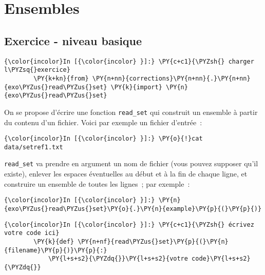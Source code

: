     \hypertarget{ensembles}{%
\section{Ensembles}\label{ensembles}}

    \hypertarget{exercice---niveau-basique}{%
\subsection{Exercice - niveau basique}\label{exercice---niveau-basique}}

    \begin{Verbatim}[commandchars=\\\{\}]
{\color{incolor}In [{\color{incolor} }]:} \PY{c+c1}{\PYZsh{} charger l\PYZsq{}exercice}
        \PY{k+kn}{from} \PY{n+nn}{corrections}\PY{n+nn}{.}\PY{n+nn}{exo\PYZus{}read\PYZus{}set} \PY{k}{import} \PY{n}{exo\PYZus{}read\PYZus{}set}
\end{Verbatim}


    On se propose d'écrire une fonction \texttt{read\_set} qui construit un
ensemble à partir du contenu d'un fichier. Voici par exemple un fichier
d'entrée~:

    \begin{Verbatim}[commandchars=\\\{\}]
{\color{incolor}In [{\color{incolor} }]:} \PY{o}{!}cat data/setref1.txt
\end{Verbatim}


    \texttt{read\_set} va prendre en argument un nom de fichier (vous pouvez
supposer qu'il existe), enlever les espaces éventuelles au début et à la
fin de chaque ligne, et construire un ensemble de toutes les lignes~;
par exemple~:

    \begin{Verbatim}[commandchars=\\\{\}]
{\color{incolor}In [{\color{incolor} }]:} \PY{n}{exo\PYZus{}read\PYZus{}set}\PY{o}{.}\PY{n}{example}\PY{p}{(}\PY{p}{)}
\end{Verbatim}


    \begin{Verbatim}[commandchars=\\\{\}]
{\color{incolor}In [{\color{incolor} }]:} \PY{c+c1}{\PYZsh{} écrivez votre code ici}
        \PY{k}{def} \PY{n+nf}{read\PYZus{}set}\PY{p}{(}\PY{n}{filename}\PY{p}{)}\PY{p}{:}
            \PY{l+s+s2}{\PYZdq{}}\PY{l+s+s2}{votre code}\PY{l+s+s2}{\PYZdq{}}
\end{Verbatim}


